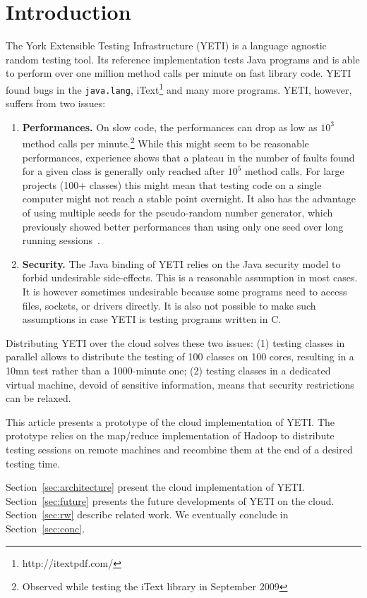 \section{Introduction}
The York Extensible Testing Infrastructure (YETI) is a language agnostic 
random testing tool. Its reference implementation tests Java programs
and is able to perform over one million method calls per minute on fast library
code. YETI found bugs in the \texttt{java.lang}, iText\footnote{http://itextpdf.com/} and many more 
programs. YETI, however, suffers from two issues:
\begin{enumerate}
\item \textbf{Performances.} On slow code, the performances can drop as low as $10^{3}$
method calls per minute.\footnote{Observed while testing the iText library in 
September 2009} While this might seem to be reasonable performances, experience shows 
that a plateau in the number of faults found for a given class is generally only reached after 
$10^{5}$ method calls. For large projects (100+ classes) this might mean that testing 
code on a single computer might not reach a stable point overnight. It also has the advantage of
using multiple seeds for the pseudo-random number generator, which previously showed better
performances than using only one seed over long running sessions~\cite{CPLOM:08:PRTOOS}.
\item \textbf{Security.} The Java binding of YETI relies on the Java security model to forbid 
undesirable side-effects. This is a reasonable assumption in most cases. It is however
sometimes undesirable because some programs need to access files, sockets, or drivers 
directly. It is also not possible to make such assumptions in case YETI is testing 
programs written in C.
\end{enumerate}

Distributing YETI over the cloud solves these two issues: (1) testing classes in parallel
allows to distribute the testing of 100 classes on 100 cores, resulting in a 10mn test 
rather than a 1000-minute one; (2) testing classes in a dedicated virtual machine, devoid of sensitive 
information, means that security restrictions can be relaxed.

This article presents a prototype of the cloud implementation of YETI. The prototype relies
on the map/reduce implementation of Hadoop to distribute testing sessions on remote machines 
and recombine them at the end of a desired testing time.

Section~\ref{sec:architecture} present the cloud implementation of YETI. Section~\ref{sec:future} 
presents the future developments of YETI on the cloud. Section~\ref{sec:rw} describe related work.
We eventually conclude in Section~\ref{sec:conc}.